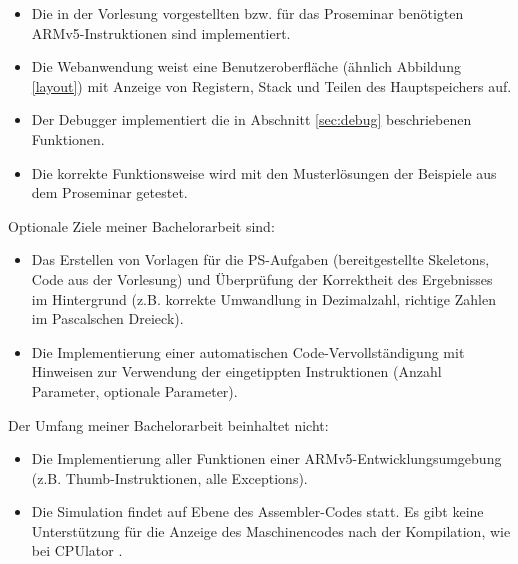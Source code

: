 \documentclass[a4paper, 11pt, onecolumn]{article}
\begin{document}
\begin{itemize}
\item Die in der Vorlesung vorgestellten bzw. für das Proseminar benötigten ARMv5-Instruktionen sind implementiert.
\item Die Webanwendung weist eine Benutzeroberfläche (ähnlich Abbildung \ref{layout}) mit Anzeige von Registern, Stack und Teilen des Hauptspeichers auf.
\item Der Debugger implementiert die in Abschnitt \ref{sec:debug} beschriebenen Funktionen.
\item Die korrekte Funktionsweise wird mit den Musterlösungen der Beispiele aus dem Proseminar getestet.
\end{itemize}
Optionale Ziele meiner Bachelorarbeit sind:

\begin{itemize}
\item Das Erstellen von Vorlagen für die PS-Aufgaben (bereitgestellte Skeletons, Code aus der Vorlesung) und Überprüfung der Korrektheit des Ergebnisses im Hintergrund (z.B. korrekte Umwandlung in Dezimalzahl, richtige Zahlen im Pascalschen Dreieck).
\item Die Implementierung einer automatischen Code-Vervollständigung mit Hinweisen zur Verwendung der eingetippten Instruktionen (Anzahl Parameter, optionale Parameter).
\end{itemize}
Der Umfang meiner Bachelorarbeit beinhaltet nicht:

\begin{itemize}
\item Die Implementierung aller Funktionen einer ARMv5-Entwicklungsumgebung (z.B. Thumb-Instruktionen, alle Exceptions).
\item Die Simulation findet auf Ebene des Assembler-Codes statt. Es gibt keine Unterstützung für die Anzeige des Maschinencodes nach der Kompilation, wie bei CPUlator \cite{cpulator}.
\end{itemize}




\end{document}
